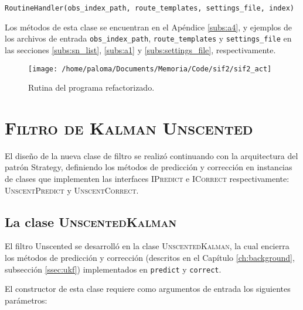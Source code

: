 \begin{center}
\texttt{RoutineHandler(obs\_index\_path, route\_templates, settings\_file, index)}
\end{center}

Los m\'etodos de esta clase se encuentran en el Ap\'endice \ref{subs:a4}, y ejemplos de los archivos de entrada \texttt{obs\_index\_path}, \texttt{route\_templates} y \texttt{settings\_file} en las secciones \ref{subs:sn_list}, \ref{subs:a1} y \ref{subs:settings_file}, respectivamente.     

\begin{figure}
\centering
\texttt{[image: /home/paloma/Documents/Memoria/Code/sif2/sif2\_act]}
\caption{Rutina del programa refactorizado.}
\label{fig:new_routine}
\end{figure}  


\section{\textsc{Filtro de Kalman Unscented}}
El dise\~no de la nueva clase de filtro se realiz\'o continuando con la arquitectura del patr\'on Strategy, definiendo los m\'etodos de predicci\'on y correcci\'on en instancias de clases que implementen las interfaces \textsc{IPredict} e \textsc{ICorrect} respectivamente: \textsc{UnscentPredict} y \textsc{UnscentCorrect}.

\subsection{La clase \textsc{UnscentedKalman}}

El filtro Unscented se desarroll\'o en la clase \textsc{UnscentedKalman}, la cual encierra los m\'etodos de predicci\'on y correcci\'on (descritos en el Cap\'itulo \ref{ch:background}, subsecci\'on \ref{ssec:ukf}) implementados en \texttt{predict} y \texttt{correct}.
\bigskip

El constructor de esta clase requiere como argumentos de entrada los siguientes par\'ametros:


